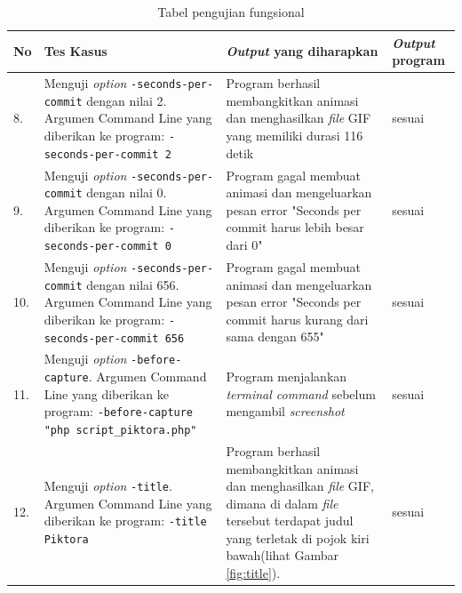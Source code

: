 \begin{table}[htbp]
\begin{tabular}{|p{0.3cm}|>{\raggedright} p{5.5 cm}| p{7 cm}| p{3 cm}|}
		
		
		
		\end{tabular}
	\label{table:hasil_pengujian1}
\end{table}


\begin{table}[htbp]
	\centering
	\caption{Tabel pengujian fungsional}
	
		\begin{tabular}{|p{0.3cm}|>{\raggedright} p{7 cm}| p{5.5 cm}| p{3 cm}|} \hline
		No & Tes Kasus	& \textit{Output} yang diharapkan & \textit{Output} program \\ \hline
		8. & Menguji \textit{option} \texttt{-seconds-per-commit} dengan nilai 2. Argumen Command Line yang diberikan ke program: \texttt{-seconds-per-commit 2} & Program berhasil membangkitkan animasi dan menghasilkan \textit{file} GIF yang memiliki durasi 116 detik & sesuai \\ \hline
		9. & Menguji \textit{option} \texttt{-seconds-per-commit} dengan nilai 0. Argumen Command Line yang diberikan ke program: \texttt{-seconds-per-commit 0} & Program gagal membuat animasi dan mengeluarkan pesan error "Seconds per commit harus lebih besar dari 0" & sesuai \\ \hline
		10. & Menguji \textit{option} \texttt{-seconds-per-commit} dengan nilai 656. Argumen Command Line yang diberikan ke program: \texttt{-seconds-per-commit 656} & Program gagal membuat animasi dan mengeluarkan pesan error "Seconds per commit harus kurang dari sama dengan  655" & sesuai \\ \hline
		11. & Menguji \textit{option} \texttt{-before-capture}. Argumen Command Line yang diberikan ke program: \texttt{-before-capture "php script\_piktora.php"} & Program menjalankan \textit{terminal command} sebelum mengambil \textit{screenshot} & sesuai  \\ \hline
		
		12. & Menguji \textit{option} \texttt{-title}. Argumen Command Line yang diberikan ke program: \texttt{-title Piktora}  & Program berhasil membangkitkan animasi dan menghasilkan \textit{file} GIF, dimana di dalam \textit{file} tersebut terdapat judul yang terletak di pojok kiri bawah(lihat Gambar \ref{fig:title}). & sesuai \\ \hline
					

\end{tabular}
\end{table}
